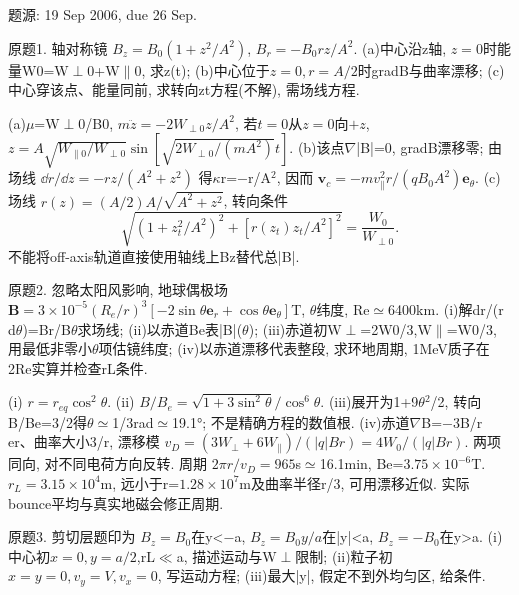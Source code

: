 题源: 19 Sep 2006, due 26 Sep.
\begin{exercise}\label{ex:06-2-1}
原题1. 轴对称镜 $B_z=B_0(1+z^2/A^2)$, $B_r=-B_0rz/A^2$. (a)中心沿z轴, $z=0$时能量W0=W\ensuremath{\perp}0+W\ensuremath{\parallel}0, 求z(t); (b)中心位于$z=0,r=A/2$时gradB与曲率漂移; (c)中心穿该点、能量同前, 求转向zt方程(不解), 需场线方程.
\end{exercise}
\begin{solution}
(a)\ensuremath{\mu}=W\ensuremath{\perp}0/B0, $m\ddot z=-2W_{\perp0}z/A^2$, 若$t=0$从$z=0$向$+z$, $z=A\sqrt{W_{\parallel0}/W_{\perp0}}\sin[\sqrt{2W_{\perp0}/(mA^2)}t]$. (b)该点\ensuremath{\nabla}|B|=0, gradB漂移零; 由场线 $\dd r/\dd z=-rz/(A^2+z^2)$ 得\ensuremath{\kappa}r=\ensuremath{-}r/A\ensuremath{{}^{2}}, 因而 $\mathbf v_c=-mv_\parallel^2r/(qB_0A^2)\mathbf e_\theta$. (c)场线 $r(z)=(A/2)A/\sqrt{A^2+z^2}$, 转向条件
\begin{equation}
 \sqrt{(1+z_t^2/A^2)^2+[r(z_t)z_t/A^2]^2}
 =\frac{W_0}{W_{\perp0}}.
\end{equation}
不能将off-axis轨道直接使用轴线上Bz替代总|B|.
\end{solution}
\begin{exercise}\label{ex:06-2-2}
原题2. 忽略太阳风影响, 地球偶极场 $\mathbf B=3\times10^{-5}(R_e/r)^3[-2\sin\theta\mathbf e_r+\cos\theta\mathbf e_\theta]$T, \ensuremath{\theta}纬度, Re\ensuremath{\simeq}6400km. (i)解dr/(r d\ensuremath{\theta})=Br/B\ensuremath{\theta}求场线; (ii)以赤道Be表|B|(\ensuremath{\theta}); (iii)赤道初W\ensuremath{\perp}=2W0/3,W\ensuremath{\parallel}=W0/3, 用最低非零小\ensuremath{\theta}项估镜纬度; (iv)以赤道漂移代表整段, 求环地周期, 1MeV质子在2Re实算并检查rL条件.
\end{exercise}
\begin{solution}
(i) $r=r_{eq}\cos^2\theta$. (ii) $B/B_e=\sqrt{1+3\sin^2\theta}/\cos^6\theta$. (iii)展开为1+9\ensuremath{\theta}\ensuremath{{}^{2}}/2, 转向B/Be=3/2得\ensuremath{\theta}\ensuremath{\simeq}1/3rad\ensuremath{\simeq}19.1°; 不是精确方程的数值根. (iv)赤道\ensuremath{\nabla}B=\ensuremath{-}3B/r er、曲率大小3/r, 漂移模 $v_D=(3W_\perp+6W_\parallel)/(|q|Br)=4W_0/(|q|Br)$. 两项同向, 对不同电荷方向反转. 周期 $2\pi r/v_D=965$s\ensuremath{\simeq}16.1min, Be=$3.75\times10^{-6}$T. $r_L=3.15\times10^4$m, 远小于r=$1.28\times10^7$m及曲率半径r/3, 可用漂移近似. 实际bounce平均与真实地磁会修正周期.
\end{solution}
\begin{exercise}\label{ex:06-2-3}
原题3. 剪切层题印为 $B_z=B_0$在y<\ensuremath{-}a, $B_z=B_0y/a$在|y|<a, $B_z=-B_0$在y>a. (i)中心初$x=0,y=a/2$,rL\ensuremath{\ll}a, 描述运动与W\ensuremath{\perp}限制; (ii)粒子初$x=y=0,v_y=V,v_x=0$, 写运动方程; (iii)最大|y|, 假定不到外均匀区, 给条件.
\end{exercise}
